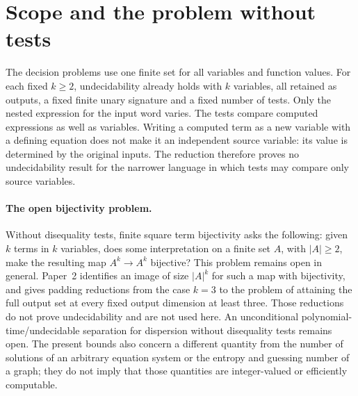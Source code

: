 \documentclass[12pt]{article}
\theoremstyle{definition}
\begin{document}
\section{Scope and the problem without tests}\label{sec:open}
The decision problems use one finite set for all variables and function values.
For each fixed $k\ge2$, undecidability already holds with $k$ variables,
all retained as outputs, a fixed finite unary signature and a fixed
number of tests. Only the nested expression for the input word varies.
The tests compare computed expressions as well as variables.
Writing a computed term as a new variable with a defining equation does
not make it an independent source variable: its value is determined
by the original inputs. The reduction therefore proves no
undecidability result for the narrower language in which tests may
compare only source variables.

\paragraph{The open bijectivity problem.}
Without disequality tests, finite square term bijectivity asks the
following: given $k$ terms in $k$ variables, does some interpretation
on a finite set $A$, with $|A|\ge2$, make the resulting map
$A^k\to A^k$ bijective? This problem remains open in general.
Paper~2 \cite{Paper2} identifies an image of size $|A|^k$ for such a
map with bijectivity, and gives padding reductions from the case $k=3$
to the problem of attaining the full output set at every fixed output
dimension at least three. Those reductions do not prove undecidability
and are not used here. An unconditional polynomial-time/undecidable
separation for dispersion without disequality tests remains open.
The present bounds also concern a different quantity from the number
of solutions of an arbitrary equation system or the entropy and
guessing number of a graph; they do not imply that those quantities
are integer-valued or efficiently computable.
\end{document}

